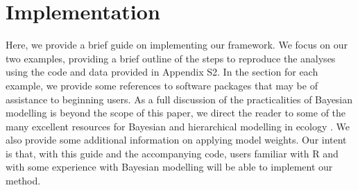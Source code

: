\documentclass[11pt]{article}
\newcommand{\rev}[1]{{\color{RoyalBlue}#1}}
\begin{document}
\section*{Implementation}
\rev{Here, we provide a brief guide on implementing our framework. We focus on our two examples, providing a brief outline of the steps to reproduce the analyses using the code and data provided in Appendix S2.
In the section for each example, we provide some references to software packages that may be of assistance to beginning users.
As a full discussion of the practicalities of Bayesian modelling is beyond the scope of this paper, we direct the reader to some of the many excellent resources for Bayesian and hierarchical modelling in ecology \citep[e.g., we suggest][]{Bolker2007, Royle2009, Link2010}.
We also provide some additional information on applying model weights.
Our intent is that, with this guide and the accompanying code, users familiar with R and with some experience with Bayesian modelling will be able to implement our method.}
\end{document}
